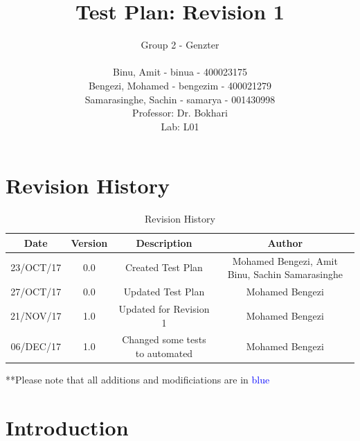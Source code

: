 \documentclass[11pt, oneside]{article}   	%
\title{Test Plan: Revision 1}
\author{Group 2 - Genzter \\
		\\ Binu, Amit - binua - 400023175
		\\ Bengezi, Mohamed - bengezim - 400021279
		\\ Samarasinghe, Sachin - samarya - 001430998
		\\Professor: Dr. Bokhari
		\\ Lab: L01}
\begin{document}
\maketitle
\newpage
\tableofcontents
\listoffigures
\listoftables

\newpage
\section{Revision History}

\begin{table}[h]
\begin{center}
\begin{tabular}{ | c | c | c | c | }
\hline
 Date & Version & Description & Author \\ 
\hline
 23/OCT/17 & 0.0 & Created Test Plan & Mohamed Bengezi, Amit Binu, Sachin Samarasinghe \\  
\hline
 27/OCT/17 & 0.0 & Updated Test Plan & Mohamed Bengezi \\  
\hline
 21/NOV/17 & 1.0 & Updated for Revision 1 & Mohamed Bengezi \\
\hline 
 06/DEC/17 & 1.0 & Changed some tests to automated & Mohamed Bengezi \\ 
\hline 
\end{tabular}
\end{center}
\caption{Revision History}
\end{table}

**Please note that all additions and modificiations are in  \textcolor{blue}{blue}



\newpage
% 
\section{Introduction}
\end{document}
